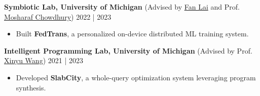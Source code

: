 \documentclass[a4paper,9pt]{extarticle}
\begin{document}
\noindent
\textbf{Symbiotic Lab, University of Michigan} (Advised by \href{https://fanlai.me/}{Fan Lai} and Prof. \href{https://www.mosharaf.com/}{Mosharaf Chowdhury}) \hfill 2022 | 2023 %
\begin{itemize}
    \item Built \textbf{FedTrans}, a personalized on-device distributed ML training system.
\end{itemize}

\noindent
\textbf{Intelligent Programming Lab, University of Michigan} (Advised by Prof. \href{https://web.eecs.umich.edu/~xwangsd/}{Xinyu Wang}) \hfill 2021 | 2023
\begin{itemize}
    \item Developed \textbf{SlabCity}, a whole-query optimization system leveraging program synthesis.
\end{itemize}


\end{document}
